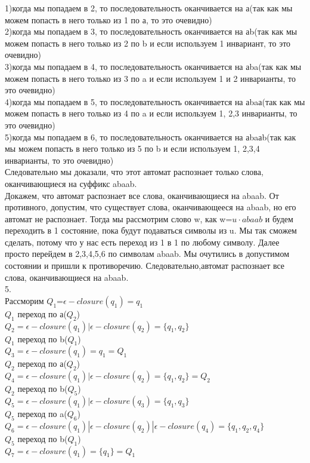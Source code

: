 \documentclass[a4paper,12pt]{article}
\begin{document}
1)когда мы попадаем в 2, то последовательность оканчивается на а(так как мы можем попасть в него только из 1 по а, то это очевидно)\\
2)когда мы попадаем в 3, то последовательность оканчивается на аb(так как мы можем попасть в него только из 2 по b и если используем 1 инвариант, то это очевидно)\\
3)когда мы попадаем в 4, то последовательность оканчивается на аba(так как мы можем попасть в него только из 3 по a и если используем 1 и 2 инварианты, то это очевидно)\\
4)когда мы попадаем в 5, то последовательность оканчивается на аbaа(так как мы можем попасть в него только из 4 по a и если используем 1, 2,3 инварианты, то это очевидно)\\
5)когда мы попадаем в 6, то последовательность оканчивается на аbaаb(так как мы можем попасть в него только из 5 по b и если используем 1, 2,3,4  инварианты, то это очевидно)\\
Следовательно мы доказали, что этот автомат распознает только слова, оканчивающиеся на суффикс abaab.\\
Докажем, что автомат распознает все слова, оканчивающиеся на abaab. От противного, допустим, что существует слова, оканчивающееся на abaab, но его автомат не распознает. Тогда мы рассмотрим слово w, как w=$u\cdot abaab$ и будем переходить в 1 состояние, пока будут подаваться символы из u. Мы так сможем сделать, потому что у нас есть переход из 1 в 1 по любому символу. Далее просто перейдем в 2,3,4,5,6 по символам abaab. Мы очутились в допустимом состоянии и пришли к противоречию. Следовательно,автомат распознает все слова, оканчивающиеся на abaab.\\
5.\\
Рассморим $Q_1$=$\epsilon-closure(q_1)=q_1$\\
$Q_1$ переход по а($Q_2$)\\
$Q_2=\epsilon-closure(q_1)|\epsilon-closure(q_2)=\lbrace q_1,q_2 \rbrace$\\
$Q_1$ переход по b($Q_1$)\\
$Q_3=\epsilon-closure(q_1)=q_1=Q_1$\\
$Q_2$ переход по а($Q_2$)\\
$Q_4=\epsilon-closure(q_1)|\epsilon-closure(q_2)=\lbrace q_1,q_2 \rbrace=Q_2$\\
$Q_2$ переход по b($Q_5$)\\
$Q_5=\epsilon-closure(q_1)|\epsilon-closure(q_3)=\lbrace q_1,q_3 \rbrace$\\
$Q_5$ переход по a($Q_6$)\\
$Q_6=\epsilon-closure(q_1)|\epsilon-closure(q_2)|\epsilon-closure(q_4)=\lbrace q_1,q_2,q_4 \rbrace$\\
$Q_5$ переход по b($Q_1$)\\
$Q_7=\epsilon-closure(q_1)=\lbrace q_1 \rbrace=Q_1$\\
\end{document}

